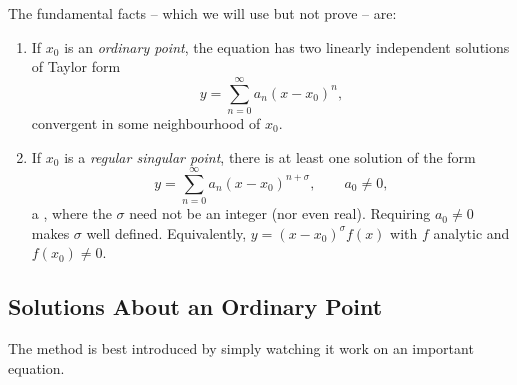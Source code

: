 \documentclass[a4paper]{scrartcl}
\begin{document}
The fundamental facts -- which we will use but not prove -- are:
\begin{enumerate}[label=(\arabic*)]
	\item If $x_0$ is an \emph{ordinary point}, the equation has two linearly independent solutions of Taylor form
	$$
	y = \sum_{n = 0}^{\infty} a_n (x - x_0)^n,
	$$
	convergent in some neighbourhood of $x_0$.
	\item If $x_0$ is a \emph{regular singular point}, there is at least one solution of the form
	$$
	y = \sum_{n = 0}^{\infty} a_n (x - x_0)^{n + \sigma}, \qquad a_0 \neq 0,
	$$
	a , where the  $\sigma$ need not be an integer (nor even real). Requiring $a_0 \neq 0$ makes $\sigma$ well defined. Equivalently, $y = (x - x_0)^\sigma f(x)$ with $f$ analytic and $f(x_0) \neq 0$.
\end{enumerate}

\subsection{Solutions About an Ordinary Point}

The method is best introduced by simply watching it work on an important equation.
\end{document}
